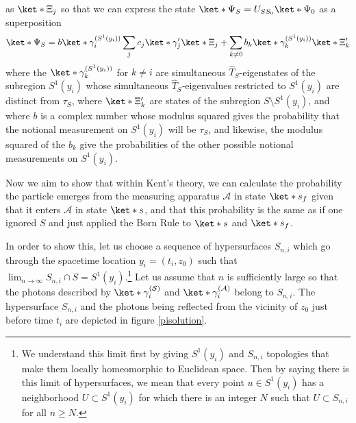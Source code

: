 \documentclass[12pt]{report}
\begin{document}
    as $\ket*{\Xi_j}$ so that we can express the state $\ket*{\Psi_S}=U_{SS_0}\ket*{\Psi_0}$ as a superposition
\begin{equation}\label{PsiSdecomp}
\ket*{\Psi_S}=b\ket*{\gamma_i^{(S^1(y_i))}}\sum_j c_j \ket*{\gamma_j'}\ket*{\Xi_j} +\sum_{k\neq 0} b_k\ket*{\gamma_k^{(S^1(y_i))}}\ket*{\Xi_k'}
\end{equation}
where the $\ket*{\gamma_k^{(S^1(y_i))}}$ %
%
 for $k\neq i$ are simultaneous $\hat{T}_S$-eigenstates of the subregion $S^1(y_i)$ whose simultaneous $\hat{T}_S$-eigenvalues restricted to $S^1(y_i)$ are distinct from $\tau_S$, where $\ket*{\Xi_k'}$ are states of the subregion $S\setminus S^1(y_i)$, and where $b$  %
  is a complex number whose modulus squared gives the probability that the notional measurement on $S^1(y_i)$ will be $\tau_S$, and likewise, the modulus squared of the $b_k$ give the probabilities of the other possible notional measurements on $S^1(y_i).$ 

Now we aim to show that within Kent's theory, we can calculate the probability the particle emerges from the measuring apparatus $\mathcal{A}$ in state $\ket*{s_{f}}$ given that it enters $\mathcal{A}$ in state $\ket*{s}$, and that this probability is the same as if one ignored $S$ and just applied the Born Rule to $\ket*{s}$ and $\ket*{s_f}$. 

In order to show this, let us choose a sequence of hypersurfaces $S_{n,i}$ %
%
which go through the spacetime location $y_i=(t_i, z_0)$ such that $\lim_{n\rightarrow\infty} S_{n,i}\cap S=S^1(y_i).$\footnote{We understand this limit first by giving $S^1(y_i)$ and $S_{n,i}$  topologies that make them locally homeomorphic to Euclidean space. Then by saying there is this limit of hypersurfaces, we mean that every point $u\in S^1(y_i)$ has a neighborhood $U\subset S^1(y_i)$ for which there is an integer $N$ such that $U\subset S_{n,i}$ for all $n\geq N$.} Let us assume that $n$ is sufficiently large so that the photons described by $\ket*{\gamma_i^{(\mathcal{S})}}$ and $\ket*{\gamma_i^{(\mathcal{A})}}$ belong to $S_{n,i}$. The hypersurface $S_{n,i}$ and the photons being reflected from the vicinity of $z_0$ just before time $t_i$ are  depicted in figure \ref{pisolution}.
\end{document}

